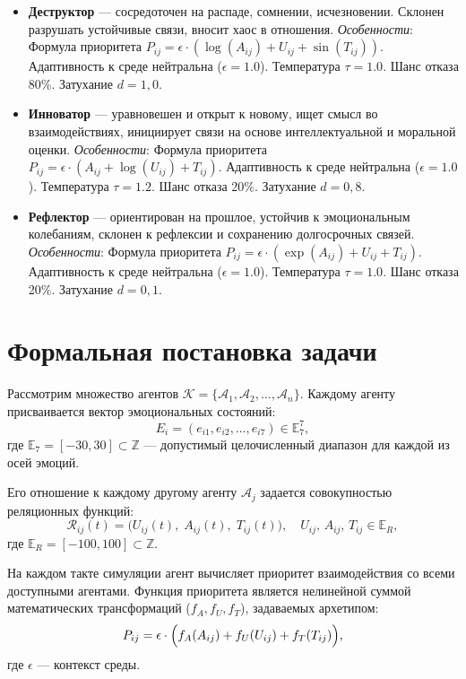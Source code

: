 \documentclass[12pt]{article}
\begin{document}
\begin{itemize}
    \item \textbf{Деструктор} — сосредоточен на распаде, сомнении, исчезновении. Склонен разрушать устойчивые связи, вносит хаос в отношения. 
    \textit{Особенности}: Формула приоритета \(P_{ij} = \epsilon \cdot (\log(A_{ij}) + U_{ij} + \sin(T_{ij}))\). Адаптивность к среде нейтральна (\(\epsilon = 1.0\)). Температура \(\tau = 1.0\). Шанс отказа 80\%. Затухание $d = 1{,}0$.
    
    \item \textbf{Инноватор} — уравновешен и открыт к новому, ищет смысл во взаимодействиях, инициирует связи на основе интеллектуальной и моральной оценки. 
    \textit{Особенности}: Формула приоритета \(P_{ij} = \epsilon \cdot (A_{ij} + \log(U_{ij}) + T_{ij})\). Адаптивность к среде нейтральна (\(\epsilon = 1.0\)). Температура \(\tau = 1.2\). Шанс отказа 20\%. Затухание $d = 0{,}8$.
    
    \item \textbf{Рефлектор} — ориентирован на прошлое, устойчив к эмоциональным колебаниям, склонен к рефлексии и сохранению долгосрочных связей. 
    \textit{Особенности}: Формула приоритета \(P_{ij} = \epsilon \cdot (\exp(A_{ij}) + U_{ij} + T_{ij})\). Адаптивность к среде нейтральна (\(\epsilon = 1.0\)). Температура \(\tau = 1.0\). Шанс отказа 20\%. Затухание $d = 0{,}1$.
\end{itemize}

\clearpage
\section{Формальная постановка задачи}

Рассмотрим множество агентов \( \mathcal{K} = \{\mathcal{A}_1, \mathcal{A}_2, \ldots, \mathcal{A}_n \} \). Каждому агенту присваивается вектор эмоциональных состояний:
\[
E_i = (e_{i1}, e_{i2}, \ldots, e_{i7}) \in \mathbb{E}_7^7,
\]
где \( \mathbb{E}_7 = [-30, 30] \subset \mathbb{Z} \) — допустимый целочисленный диапазон для каждой из осей эмоций.

Его отношение к каждому другому агенту \( \mathcal{A}_j \) задается совокупностью реляционных функций:
\[
\mathcal{R}_{ij}(t) = \bigl( U_{ij}(t),\; A_{ij}(t),\; T_{ij}(t) \bigr),\quad U_{ij},\, A_{ij},\, T_{ij} \in \mathbb{E}_{R},
\]
где \( \mathbb{E}_{R} = [-100, 100] \subset \mathbb{Z} \).

На каждом такте симуляции агент вычисляет приоритет взаимодействия со всеми доступными агентами. Функция приоритета является нелинейной суммой математических трансформаций (\(f_A, f_U, f_T\)), задаваемых архетипом:
\[
P_{ij} = \epsilon \cdot \Bigl( f_A(A_{ij}) + f_U(U_{ij}) + f_T(T_{ij}) \Bigr),
\]
где $\epsilon$ — контекст среды.
\end{document}
